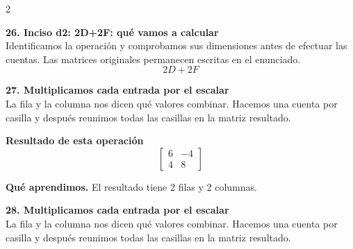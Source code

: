 \documentclass[11pt,a4paper,landscape]{article}
\begin{document}
\begin{multicols*}{2}
\begin{minipage}{\linewidth}
\end{minipage}\par\medskip
\noindent\begin{minipage}{\linewidth}\textbf{26. Inciso d2: 2D+2F: qué vamos a calcular}\\[2pt]Identificamos la operación y comprobamos sus dimensiones antes de efectuar las cuentas. Las matrices originales permanecen escritas en el enunciado.
\[2D+2F\]
\end{minipage}\par\medskip
\noindent\begin{minipage}{\linewidth}\textbf{27. Multiplicamos cada entrada por el escalar}\\[2pt]La fila y la columna nos dicen qué valores combinar. Hacemos una cuenta por casilla y después reunimos todas las casillas en la matriz resultado.
\par{}\par\smallskip
\par\smallskip \textbf{Resultado de esta operación}\[\begin{bmatrix}6 & -4\\4 & 8\end{bmatrix}\]
\par\smallskip\textbf{Qué aprendimos.} El resultado tiene 2 filas y 2 columnas.
\end{minipage}\par\medskip
\noindent\begin{minipage}{\linewidth}\textbf{28. Multiplicamos cada entrada por el escalar}\\[2pt]La fila y la columna nos dicen qué valores combinar. Hacemos una cuenta por casilla y después reunimos todas las casillas en la matriz resultado.

\end{minipage}
\end{multicols*}
\end{document}
